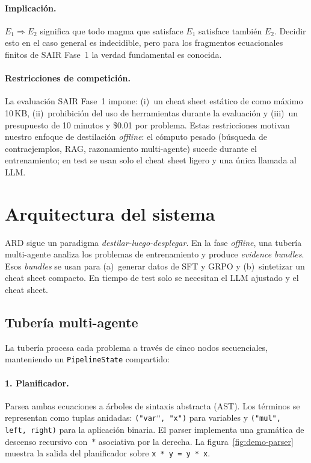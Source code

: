 \documentclass{article}
\begin{document}
\paragraph{Implicaci\'on.} $E_1 \Rightarrow E_2$ significa que todo magma que satisface $E_1$ satisface tambi\'en $E_2$. Decidir esto en el caso general es indecidible, pero para los fragmentos ecuacionales finitos de SAIR Fase~1 la verdad fundamental es conocida.

\paragraph{Restricciones de competici\'on.} La evaluaci\'on SAIR Fase~1 impone: (i)~un cheat sheet est\'atico de como m\'aximo 10\,KB, (ii)~prohibici\'on del uso de herramientas durante la evaluaci\'on y (iii)~un presupuesto de 10 minutos y \$0.01 por problema. Estas restricciones motivan nuestro enfoque de destilaci\'on \textit{offline}: el c\'omputo pesado (b\'usqueda de contraejemplos, RAG, razonamiento multi-agente) sucede durante el entrenamiento; en test se usan solo el cheat sheet ligero y una \'unica llamada al LLM.

\section{Arquitectura del sistema}
\label{sec:architecture}

ARD sigue un paradigma \emph{destilar-luego-desplegar}. En la fase \textit{offline}, una tuber\'ia multi-agente analiza los problemas de entrenamiento y produce \textit{evidence bundles}. Esos \textit{bundles} se usan para (a)~generar datos de SFT y GRPO y (b)~sintetizar un cheat sheet compacto. En tiempo de test solo se necesitan el LLM ajustado y el cheat sheet.

\subsection{Tuber\'ia multi-agente}
\label{sec:agents}

La tuber\'ia procesa cada problema a trav\'es de cinco nodos secuenciales, manteniendo un \texttt{PipelineState} compartido:

\paragraph{1. Planificador.} Parsea ambas ecuaciones a \'arboles de sintaxis abstracta (AST). Los t\'erminos se representan como tuplas anidadas: \texttt{("var",\,"x")} para variables y \texttt{("mul",\,left,\,right)} para la aplicaci\'on binaria. El parser implementa una gram\'atica de descenso recursivo con~$*$ asociativa por la derecha. La figura~\ref{fig:demo-parser} muestra la salida del planificador sobre \texttt{x~*~y~=~y~*~x}.
\end{document}
